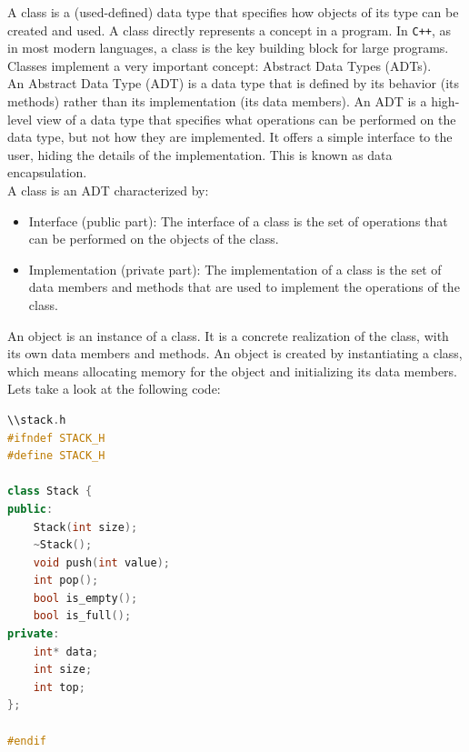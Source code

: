 A class is a (used-defined) data type that specifies how objects of its type can be created and used. A class directly 
represents a concept in a program. In \texttt{C++}, as in most modern languages, a class is the key building block for
large programs. Classes implement a very important concept: Abstract Data Types (ADTs).\\

An Abstract Data Type (ADT) is a data type that is defined by its behavior (its methods) rather than its implementation
(its data members). An ADT is a high-level view of a data type that specifies what operations can be performed on the data
type, but not how they are implemented. It offers a simple interface to the user, hiding the details of the implementation.
This is known as data encapsulation.\\

A class is an ADT characterized by:

\begin{itemize}
    \item Interface (public part): The interface of a class is the set of operations that can be performed on the objects 
    of the class.
    \item Implementation (private part): The implementation of a class is the set of data members and methods that are used 
    to implement the operations of the class.
\end{itemize}

An object is an instance of a class. It is a concrete realization of the class, with its own data members and methods. An
object is created by instantiating a class, which means allocating memory for the object and initializing its data members.\\

Lets take a look at the following code:

\begin{lstlisting}[language=C++]
\\stack.h
#ifndef STACK_H
#define STACK_H

class Stack {
public:
    Stack(int size);
    ~Stack();
    void push(int value);
    int pop();
    bool is_empty();
    bool is_full();
private:
    int* data;
    int size;
    int top;
};

#endif
\end{lstlisting}

